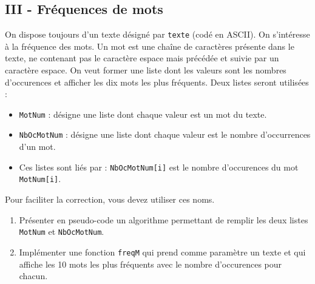 \subsection*{III - Fréquences de mots}
On dispose toujours d'un texte désigné par \verb|texte| (codé en ASCII). On s'intéresse à la fréquence des mots. Un mot est une chaîne de caractères présente dans le texte, ne contenant pas le caractère espace mais précédée et suivie par un caractère espace. On veut former une liste dont les valeurs sont les nombres d'occurences et afficher les dix mots les plus fréquents.\newline
Deux listes seront utilisées :
\begin{itemize}
  \item \verb|MotNum| : désigne une liste dont chaque valeur est un mot du texte.
  \item \verb|NbOcMotNum| : désigne une liste dont chaque valeur est le nombre d'occurrences d'un mot.
  \item Ces listes sont liés par : \verb|NbOcMotNum[i]| est le nombre d'occurences du mot \verb|MotNum[i]|.
\end{itemize}
Pour faciliter la correction, vous devez utiliser ces noms.
\begin{enumerate}
  \item Présenter en pseudo-code un algorithme permettant de remplir les deux listes \verb|MotNum| et \verb|NbOcMotNum|.
  \item Implémenter une fonction \verb|freqM| qui prend comme paramètre un texte et qui affiche les 10 mots les plus fréquents avec le nombre d'occurences pour chacun. 
\end{enumerate}
